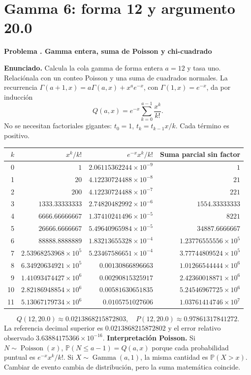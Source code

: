 \documentclass[11pt,a4paper]{article}
\newcommand{\Prob}{\mathbb P}
\theoremstyle{definition}
\newcounter{problema}
\newenvironment{resuelto}[1]{\refstepcounter{problema}\par\medskip\Needspace{6\baselineskip}\textbf{Problema \theproblema. #1}\par}{\par\medskip}
\begin{document}
\section{Gamma 6: forma 12 y argumento 20.0}
\begin{resuelto}{Gamma entera, suma de Poisson y chi-cuadrado}
\textbf{Enunciado.} Calcula la cola gamma de forma entera $a=12$ y tasa uno. Relaciónala con un conteo Poisson y una suma de cuadrados normales.
La recurrencia $\Gamma(a+1,x)=a\Gamma(a,x)+x^ae^{-x}$, con $\Gamma(1,x)=e^{-x}$, da por inducción
\[
Q(a,x)=e^{-x}\sum_{k=0}^{a-1}\frac{x^k}{k!}.
\]
No se necesitan factoriales gigantes: $t_0=1$, $t_k=t_{k-1}x/k$. Cada término es positivo.

\begin{center}\small\begin{tabular}{rrrr}
\toprule
$k$&$x^k/k!$&$e^{-x}x^k/k!$&Suma parcial sin factor\\
\midrule
0&$1$&$2.06115362244\times10^{-9}$&$1$\\
1&$20$&$4.12230724488\times10^{-8}$&$21$\\
2&$200$&$4.12230724488\times10^{-7}$&$221$\\
3&$1333.33333333$&$2.74820482992\times10^{-6}$&$1554.33333333$\\
4&$6666.66666667$&$1.37410241496\times10^{-5}$&$8221$\\
5&$26666.6666667$&$5.49640965984\times10^{-5}$&$34887.6666667$\\
6&$88888.8888889$&$1.83213655328\times10^{-4}$&$1.23776555556\times10^{5}$\\
7&$2.53968253968\times10^{5}$&$5.23467586651\times10^{-4}$&$3.77744809524\times10^{5}$\\
8&$6.34920634921\times10^{5}$&$0.00130866896663$&$1.01266544444\times10^{6}$\\
9&$1.41093474427\times10^{6}$&$0.00290815325917$&$2.42360018871\times10^{6}$\\
10&$2.82186948854\times10^{6}$&$0.00581630651835$&$5.24546967725\times10^{6}$\\
11&$5.13067179734\times10^{6}$&$0.0105751027606$&$1.03761414746\times10^{7}$\\
\bottomrule\end{tabular}\end{center}
\[
Q(12,20.0)\approx0.0213868215872803,\quad
P(12,20.0)\approx0.97861317841272.
\]
La referencia decimal superior es $0.0213868215872802$ y el error relativo observado $3.63884175366\times10^{-16}$.
\textbf{Interpretación Poisson.} Si $N\sim\operatorname{Poisson}(x)$, $\Prob(N\le a-1)=Q(a,x)$ porque cada probabilidad puntual es $e^{-x}x^k/k!$. Si $X\sim\operatorname{Gamma}(a,1)$, la misma cantidad es $\Prob(X>x)$. Cambiar de evento cambia de distribución, pero la suma matemática coincide.

\end{resuelto}
\end{document}
